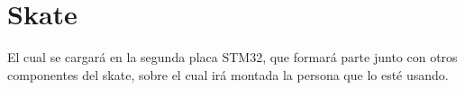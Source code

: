 \chapter{Skate}
\hypertarget{md__r_e_a_d_m_e}{}\label{md__r_e_a_d_m_e}
\label{md__r_e_a_d_m_e_autotoc_md0}%
%
El cual se cargará en la segunda placa STM32, que formará parte junto con otros componentes del skate, sobre el cual irá montada la persona que lo esté usando. 